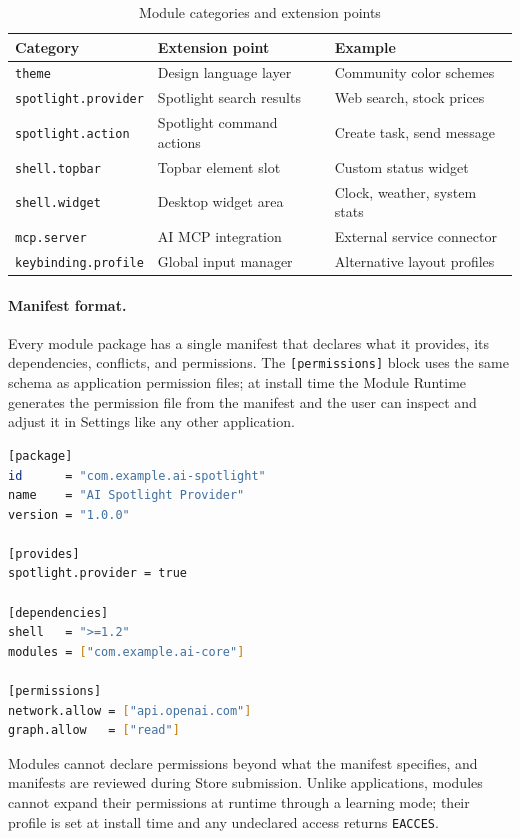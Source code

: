 \begin{table}[htbp]
\caption{Module categories and extension points}
\label{tab:modules}
\begin{tabularx}{\linewidth}{llX}
\toprule
\textbf{Category} & \textbf{Extension point} & \textbf{Example} \\
\midrule
\texttt{theme}              & Design language layer    & Community color schemes \\
\texttt{spotlight.provider} & Spotlight search results & Web search, stock prices \\
\texttt{spotlight.action}   & Spotlight command actions & Create task, send message \\
\texttt{shell.topbar}       & Topbar element slot      & Custom status widget \\
\texttt{shell.widget}       & Desktop widget area      & Clock, weather, system stats \\
\texttt{mcp.server}         & AI MCP integration       & External service connector \\
\texttt{keybinding.profile} & Global input manager     & Alternative layout profiles \\
\bottomrule
\end{tabularx}
\end{table}

\paragraph{Manifest format.}
Every module package has a single manifest that declares what it provides,
its dependencies, conflicts, and permissions. The \texttt{[permissions]} block
uses the same schema as application permission files; at install time the
Module Runtime generates the permission file from the manifest and the user can
inspect and adjust it in Settings like any other application.

\begin{lstlisting}[language=bash, caption={Example module manifest}]
[package]
id      = "com.example.ai-spotlight"
name    = "AI Spotlight Provider"
version = "1.0.0"

[provides]
spotlight.provider = true

[dependencies]
shell   = ">=1.2"
modules = ["com.example.ai-core"]

[permissions]
network.allow = ["api.openai.com"]
graph.allow   = ["read"]
\end{lstlisting}

Modules cannot declare permissions beyond what the manifest specifies, and
manifests are reviewed during Store submission. Unlike applications, modules
cannot expand their permissions at runtime through a learning mode; their
profile is set at install time and any undeclared access returns
\texttt{EACCES}.


